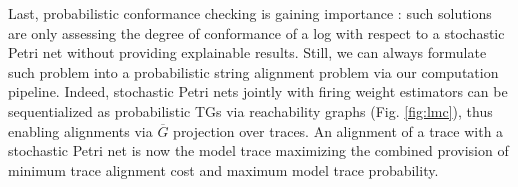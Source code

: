 Last, probabilistic conformance checking is gaining importance \cite{DBLP:conf/bpm/LeemansSA19,DBLP:conf/icpm/PolyvyanyyK19,DBLP:journals/tosem/PolyvyanyySWCM20}: such solutions are only assessing the degree of conformance of a log with respect to a stochastic Petri net without providing explainable results. Still, we can always formulate such problem into a probabilistic string alignment problem via our computation pipeline. Indeed, stochastic Petri nets jointly with firing weight estimators \cite{spdwe} can be sequentialized as probabilistic TGs via reachability graphs (Fig. \ref{fig:lmc}), thus enabling alignments via $\overline{G}$ projection over traces. An alignment of a trace with a stochastic Petri net is now the model trace maximizing the combined provision of minimum trace alignment cost and maximum model trace probability.








